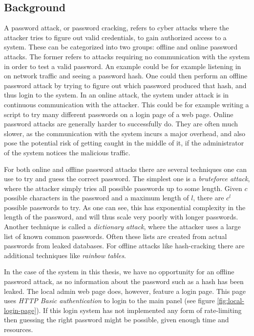 \subsection{Background}
A password attack, or password cracking, refers to cyber attacks where the attacker tries to figure out valid credentials, to gain authorized access to a system. These can be categorized into two groups: offline and online password attacks. The former refers to attacks requiring no communication with the system in order to test a valid password. An example could be for example listening in on network traffic and seeing a password hash. One could then perform an offline password attack by trying to figure out which password produced that hash, and thus login to the system. In an online attack, the system under attack is in continuous communication with the attacker. This could be for example writing a script to try many different passwords on a login page of a web page. Online password attacks are generally harder to successfully do. They are often much slower, as the communication with the system incurs a major overhead, and also pose the potential risk of getting caught in the middle of it, if the administrator of the system notices the malicious traffic.

For both online and offline password attacks there are several techniques one can use to try and guess the correct password. The simplest one is a \textit{bruteforce attack}, where the attacker simply tries all possible passwords up to some length. Given $c$ possible characters in the password and a maximum length of $l$, there are $c^l$ possible passwords to try. As one can see, this has exponential complexity in the length of the password, and will thus scale very poorly with longer passwords. Another technique is called a \textit{dictionary attack}, where the attacker uses a large list of known common passwords. Often these lists are created from actual passwords from leaked databases. For offline attacks like hash-cracking there are additional techniques like \textit{rainbow tables}.

In the case of the system in this thesis, we have no opportunity for an offline password attack, as no information about the password such as a hash has been leaked. The local admin web page does, however, feature a login page. This page uses \textit{HTTP Basic authentication} to login to the main panel (see figure \ref{fig:local-login-page}). If this login system has not implemented any form of rate-limiting then guessing the right password might be possible, given enough time and resources.

